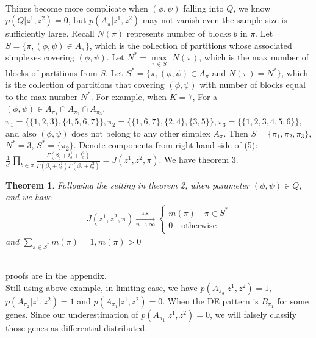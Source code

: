 \documentclass[11pt]{amsart}
\newtheorem{theorem}{Theorem}
\begin{document}
\hfill\\
Things become more complicate when $(\phi, \psi)$ falling into $Q$, we know $p(Q | z^1, z^2) = 0$, but $p(A_\pi | z^1, z^2)$ may not vanish even the sample size is sufficiently large. Recall $N(\pi)$ represents number of blocks $b$ in $\pi$. Let $S = \{\pi,  (\phi, \psi) \in A_\pi\}$, which is the collection of partitions whose associated simplexes covering $(\phi,\psi)$. Let $N^* = \underset{\pi\in S}\max$ $N(\pi)$, which is the max number of blocks of partitions from $S$. Let $S^* = \{\pi,  (\phi, \psi) \in A_\pi \text{ and } N(\pi) = N^*\}$, which is the collection of partitions that covering $(\phi, \psi)$ with number of blocks equal to the max number $N^*$. For example, when $K = 7$, For a $(\phi, \psi)\in A_{\pi_1} \cap A_{\pi_2} \cap A_{\pi_3}$, $\pi_1 = \{\{1,2,3\}, \{4,5,6,7\}\}, \pi_2 = \{\{1,6,7\}, \{2,4\},\{3,5\}\}, \pi_3 = \{\{1,2,3,4,5,6\}\}$, and also $(\phi, \psi)$ does not belong to any other simplex $A_\pi$. Then $S = \{\pi_1, \pi_2, \pi_3\}$, $N^* = 3$, $S^* = \{\pi_2\}.$ Denote components from right hand side of (5): $\frac{1}{c'}\underset{b\in \pi}\prod\frac{ \Gamma(\beta_b + t_b^1 + t_b^2)}{\Gamma(\beta_b + t_b^1)\Gamma(\beta_b + t_b^2)} = J(z^1,z^2,\pi).$  We have theorem 3.\\
\begin{theorem} Following the setting in theorem 2, when parameter $(\phi, \psi)\in Q$,  and we have 
\begin{eqnarray*}
    J(z^1,z^2,\pi) \xrightarrow[n\rightarrow\infty]{\text{a.s.}}\left\{
                \begin{array}{ll}
                 m(\pi) \quad  \pi \in S^* \\
                 0 \quad \text{otherwise}\\             
                \end{array}
              \right.
\end{eqnarray*}
and $\underset{\pi\in S^*}\sum m(\pi) = 1, m(\pi) > 0$\\
\end{theorem}\hfill\\
proofs are in the appendix.\\
Still using above example, in limiting case, we have $p(A_{\pi_3} | z^1, z^2) = 1$, $p(A_{\pi_2} | z^1, z^2) = 1$ and $p(A_{\pi_1}| z^1, z^2) = 0$. When the DE pattern is $B_{\pi_1}$ for some genes. Since our underestimation of $p(A_{\pi_1}| z^1, z^2) = 0$, we will falsely classify those genes as differential distributed.
\end{document}
